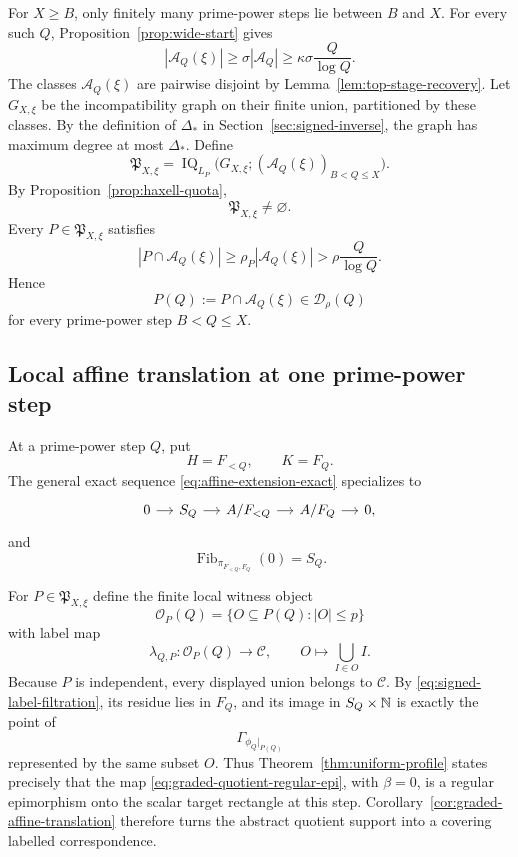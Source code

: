 For $X\ge B$, only finitely many prime-power steps lie between $B$ and $X$.  For every such $Q$, Proposition~\ref{prop:wide-start} gives
\begin{equation}\label{eq:survivor-density}
|\mathcal A_Q(\xi)|
\ge\sigma|\mathcal A_Q|
\ge\kappa\sigma\frac Q{\log Q}.
\end{equation}
The classes $\mathcal A_Q(\xi)$ are pairwise disjoint by Lemma~\ref{lem:top-stage-recovery}.  Let $G_{X,\xi}$ be the incompatibility graph on their finite union, partitioned by these classes.  By the definition of $\Delta_*$ in Section~\ref{sec:signed-inverse}, the graph has maximum degree at most $\Delta_*$.  Define
\begin{equation}\label{eq:haxell-parameter-object}
\mathfrak P_{X,\xi}
=
\operatorname{IQ}_{L_P}
\bigl(G_{X,\xi};(\mathcal A_Q(\xi))_{B<Q\le X}\bigr).
\end{equation}
By Proposition~\ref{prop:haxell-quota},
\begin{equation}\label{eq:haxell-parameter-nonempty}
\mathfrak P_{X,\xi}\ne\varnothing.
\end{equation}
Every $P\in\mathfrak P_{X,\xi}$ satisfies
\begin{equation}\label{eq:packed-density}
|P\cap\mathcal A_Q(\xi)|
\ge\rho_P|\mathcal A_Q(\xi)|
>\rho\frac Q{\log Q}.
\end{equation}
Hence
\[
P(Q):=P\cap\mathcal A_Q(\xi)
\in\mathcal D_\rho(Q)
\]
for every prime-power step $B<Q\le X$.

\subsection{Local affine translation at one prime-power step}

At a prime-power step $Q$, put
\[
H=F_{<Q},
\qquad
K=F_Q.
\]
The general exact sequence \eqref{eq:affine-extension-exact} specializes to
\begin{equation}\label{eq:simple-extension}
\begin{tikzcd}[column sep=small]
0 \arrow[r] & S_Q \arrow[r] & A/F_{<Q} \arrow[r] & A/F_Q \arrow[r] & 0,
\end{tikzcd}
\end{equation}
and
\[
\operatorname{Fib}_{\pi_{F_{<Q},F_Q}}(0)=S_Q.
\]

For $P\in\mathfrak P_{X,\xi}$ define the finite local witness object
\begin{equation}\label{eq:physical-local-labels}
\mathscr O_P(Q)
=
\{O\subseteq P(Q):|O|\le p\}
\end{equation}
with label map
\[
\lambda_{Q,P}:\mathscr O_P(Q)\longrightarrow\mathcal C,
\qquad
O\longmapsto\bigcup_{I\in O}I.
\]
Because $P$ is independent, every displayed union belongs to $\mathcal C$.  By \eqref{eq:signed-label-filtration}, its residue lies in $F_Q$, and its image in $S_Q\times\mathbb N$ is exactly the point of
\[
\Gamma_{\phi_Q|_{P(Q)}}
\]
represented by the same subset $O$.  Thus Theorem~\ref{thm:uniform-profile} states precisely that the map \eqref{eq:graded-quotient-regular-epi}, with $\beta=0$, is a regular epimorphism onto the scalar target rectangle at this step.  Corollary~\ref{cor:graded-affine-translation} therefore turns the abstract quotient support into a covering labelled correspondence.

